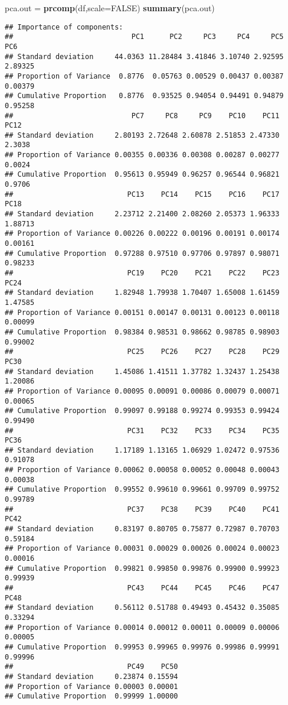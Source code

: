 \documentclass[]{article}
\newenvironment{Shaded}{\begin{snugshade}}{\end{snugshade}}
\newcommand{\KeywordTok}[1]{\textcolor[rgb]{0.13,0.29,0.53}{\textbf{#1}}}
\newcommand{\DataTypeTok}[1]{\textcolor[rgb]{0.13,0.29,0.53}{#1}}
\newcommand{\StringTok}[1]{\textcolor[rgb]{0.31,0.60,0.02}{#1}}
\newcommand{\OtherTok}[1]{\textcolor[rgb]{0.56,0.35,0.01}{#1}}
\newcommand{\NormalTok}[1]{#1}
\begin{document}
\begin{Shaded}
\begin{Highlighting}[]
\NormalTok{pca.out =}\StringTok{ }\KeywordTok{prcomp}\NormalTok{(df,}\DataTypeTok{scale=}\OtherTok{FALSE}\NormalTok{)}
\KeywordTok{summary}\NormalTok{(pca.out)}
\end{Highlighting}
\end{Shaded}

\begin{verbatim}
## Importance of components:
##                            PC1      PC2     PC3     PC4     PC5     PC6
## Standard deviation     44.0363 11.28484 3.41846 3.10740 2.92595 2.89325
## Proportion of Variance  0.8776  0.05763 0.00529 0.00437 0.00387 0.00379
## Cumulative Proportion   0.8776  0.93525 0.94054 0.94491 0.94879 0.95258
##                            PC7     PC8     PC9    PC10    PC11   PC12
## Standard deviation     2.80193 2.72648 2.60878 2.51853 2.47330 2.3038
## Proportion of Variance 0.00355 0.00336 0.00308 0.00287 0.00277 0.0024
## Cumulative Proportion  0.95613 0.95949 0.96257 0.96544 0.96821 0.9706
##                           PC13    PC14    PC15    PC16    PC17    PC18
## Standard deviation     2.23712 2.21400 2.08260 2.05373 1.96333 1.88713
## Proportion of Variance 0.00226 0.00222 0.00196 0.00191 0.00174 0.00161
## Cumulative Proportion  0.97288 0.97510 0.97706 0.97897 0.98071 0.98233
##                           PC19    PC20    PC21    PC22    PC23    PC24
## Standard deviation     1.82948 1.79938 1.70407 1.65008 1.61459 1.47585
## Proportion of Variance 0.00151 0.00147 0.00131 0.00123 0.00118 0.00099
## Cumulative Proportion  0.98384 0.98531 0.98662 0.98785 0.98903 0.99002
##                           PC25    PC26    PC27    PC28    PC29    PC30
## Standard deviation     1.45086 1.41511 1.37782 1.32437 1.25438 1.20086
## Proportion of Variance 0.00095 0.00091 0.00086 0.00079 0.00071 0.00065
## Cumulative Proportion  0.99097 0.99188 0.99274 0.99353 0.99424 0.99490
##                           PC31    PC32    PC33    PC34    PC35    PC36
## Standard deviation     1.17189 1.13165 1.06929 1.02472 0.97536 0.91078
## Proportion of Variance 0.00062 0.00058 0.00052 0.00048 0.00043 0.00038
## Cumulative Proportion  0.99552 0.99610 0.99661 0.99709 0.99752 0.99789
##                           PC37    PC38    PC39    PC40    PC41    PC42
## Standard deviation     0.83197 0.80705 0.75877 0.72987 0.70703 0.59184
## Proportion of Variance 0.00031 0.00029 0.00026 0.00024 0.00023 0.00016
## Cumulative Proportion  0.99821 0.99850 0.99876 0.99900 0.99923 0.99939
##                           PC43    PC44    PC45    PC46    PC47    PC48
## Standard deviation     0.56112 0.51788 0.49493 0.45432 0.35085 0.33294
## Proportion of Variance 0.00014 0.00012 0.00011 0.00009 0.00006 0.00005
## Cumulative Proportion  0.99953 0.99965 0.99976 0.99986 0.99991 0.99996
##                           PC49    PC50
## Standard deviation     0.23874 0.15594
## Proportion of Variance 0.00003 0.00001
## Cumulative Proportion  0.99999 1.00000
\end{verbatim}
\end{document}
